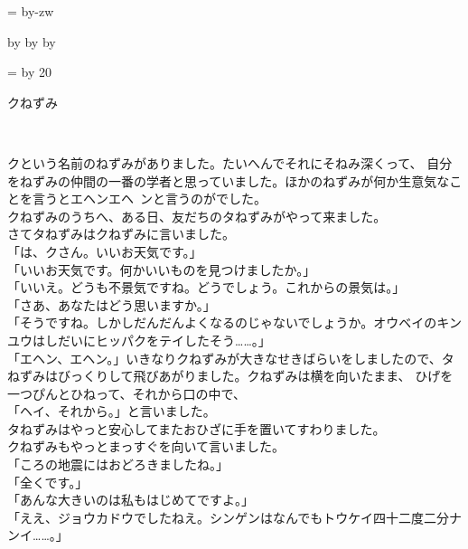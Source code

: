 \documentclass[
a4paper,
10pt,
book]
{tarticle}
\makeatletter
\def\mojiparline#1{
    \newcounter{mpl}
    \setcounter{mpl}{#1}
    \@tempdima=\linewidth
    \advance\@tempdima by-\value{mpl}zw
    \addtocounter{mpl}{-1}
    \divide\@tempdima by \value{mpl}
    \advance\kanjiskip by\@tempdima
    \advance\parindent by\@tempdima
    }
\def\linesparpage#1{
        \baselineskip=\textheight
        \divide\baselineskip by #1
        }
\makeatother
\begin{document}
\Large

\mojiparline{50}
\linesparpage{20}

{} %
\mcfamily %

\thispagestyle{empty}
{\fontsize{30pt}{24pt}\selectfont
クねずみ\\
\begin{flushright}
    \\
\end{flushright}
}
\newpage
\setcounter{page}{1}

\pagewiselinenumbers

\indent クという名前のねずみがありました。たいへんでそれにそねみ深くって、
自分をねずみの仲間の一番の学者と思っていました。ほかのねずみが何か生意気なことを言うとエヘンエヘ~ンと言うのがでした。\\
\indent クねずみのうちへ、ある日、友だちのタねずみがやって来ました。\\
\indent さてタねずみはクねずみに言いました。\\
「は、クさん。いいお天気です。」\\
「いいお天気です。何かいいものを見つけましたか。」\\
「いいえ。どうも不景気ですね。どうでしょう。これからの景気は。」\\
「さあ、あなたはどう思いますか。」\\
「そうですね。しかしだんだんよくなるのじゃないでしょうか。オウベイのキンユウはしだいにヒッパクをテイしたそう……。」\\
「エヘン、エヘン。」いきなりクねずみが大きなせきばらいをしましたので、タねずみはびっくりして飛びあがりました。クねずみは横を向いたまま、
ひげを一つぴんとひねって、それから口の中で、\\
「ヘイ、それから。」と言いました。\\
\indent タねずみはやっと安心してまたおひざに手を置いてすわりました。\\
\indent クねずみもやっとまっすぐを向いて言いました。\\
「ころの地震にはおどろきましたね。」\\
「全くです。」\\
「あんな大きいのは私もはじめてですよ。」\\
「ええ、ジョウカドウでしたねえ。シンゲンはなんでもトウケイ四十二度二分ナンイ……。」\\
\end{document}
